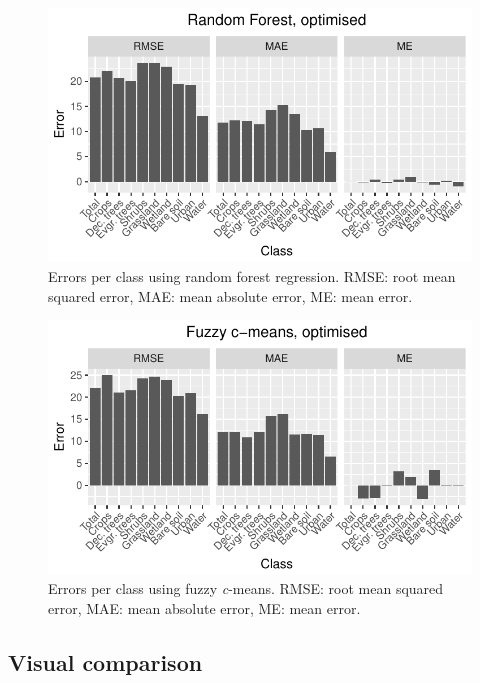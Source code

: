 \documentclass[a4paper,10pt]{book}
\begin{document}
\begin{figure}
  \centering
  \includegraphics[width=\textwidth]{../plot/perclass-errors-rf}
  \caption{Errors per class using random forest regression. RMSE: root mean squared error, MAE: mean absolute error, ME: mean error.}
  \label{fig-perclass-errors-rf}
\end{figure}

\begin{figure}
  \centering
  \includegraphics[width=\textwidth]{../plot/perclass-errors-cm}
  \caption{Errors per class using fuzzy \textit{c}-means. RMSE: root mean squared error, MAE: mean absolute error, ME: mean error.}
  \label{fig-perclass-errors-cm}
\end{figure}

\subsection{Visual comparison}
\end{document}

